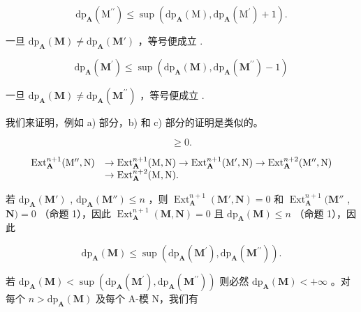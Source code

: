 \[
\mathrm{dp} _ {\mathbf {A}} \left(\mathrm{M} ^ {\prime \prime}\right) \leqslant \sup \left(\mathrm{dp} _ {\mathbf {A}} (\mathrm{M}), \mathrm{dp} _ {\mathbf {A}} \left(\mathrm{M} ^ {\prime}\right) + 1\right).
\]

一旦 \(\mathrm{dp}_{\mathbf{A}}(\mathbf{M}) \neq \mathrm{dp}_{\mathbf{A}}(\mathbf{M}')\) ，等号便成立 .

\[
\mathrm{dp} _ {\mathbf {A}} \left(\mathbf {M} ^ {\prime}\right) \leqslant \sup \left(\mathrm{dp} _ {\mathbf {A}} (\mathbf {M}), \mathrm{dp} _ {\mathbf {A}} \left(\mathbf {M} ^ {\prime \prime}\right) - 1\right)
\]

一旦 \(\mathrm{dp}_{\mathbf{A}}(\mathbf{M}) \neq \mathrm{dp}_{\mathbf{A}}(\mathbf{M}^{\prime \prime})\) ，等号便成立 .

我们来证明，例如 a) 部分，b) 和 c) 部分的证明是类似的。

\[
\geqslant 0.
\]

\[
\begin{array}{r l}\operatorname{Ext} _ {\mathbf {A}} ^ {n + 1} (\mathrm{M} ^ {\prime \prime}, \mathrm{N})&\rightarrow \operatorname{Ext} _ {\mathbf {A}} ^ {n + 1} (\mathrm{M}, \mathrm{N}) \rightarrow \operatorname{Ext} _ {\mathbf {A}} ^ {n + 1} (\mathrm{M} ^ {\prime}, \mathrm{N}) \rightarrow \operatorname{Ext} _ {\mathbf {A}} ^ {n + 2} (\mathrm{M} ^ {\prime \prime}, \mathrm{N})\\&\rightarrow \operatorname{Ext} _ {\mathbf {A}} ^ {n + 2} (\mathrm{M}, \mathrm{N}).\end{array}
\]

若 \(\mathrm{dp}_{\mathbf{A}}(\mathbf{M}')\) , \(\mathrm{dp}_{\mathbf{A}}(\mathbf{M}'')\leqslant n\) ，则 \(\operatorname{Ext}_{\mathbf{A}}^{n+1}(\mathbf{M}',\mathbf{N})=0\) 和 \(\operatorname{Ext}_{\mathbf{A}}^{n+1}(\mathbf{M}''\) , \(\mathbf{N})=0\) （命题 1），因此 \(\operatorname{Ext}_{\mathbf{A}}^{n+1}(\mathbf{M},\mathbf{N})=0\) 且 \(\mathrm{dp}_{\mathbf{A}}(\mathbf{M})\leqslant n\) （命题 1），因此

\[
\mathrm{dp} _ {\mathbf {A}} (\mathbf {M}) \leqslant \sup \left(\mathrm{dp} _ {\mathbf {A}} (\mathbf {M} ^ {\prime}), \mathrm{dp} _ {\mathbf {A}} (\mathbf {M} ^ {\prime \prime})\right).
\]

若 \(\mathrm{dp}_{\mathbf{A}}(\mathbf{M}) < \sup (\mathrm{dp}_{\mathbf{A}}(\mathbf{M}^{\prime}),\mathrm{dp}_{\mathbf{A}}(\mathbf{M}^{\prime \prime}))\) 则必然 \(\mathrm{dp}_{\mathbf{A}}(\mathbf{M}) < + \infty\) 。对每个 \(n > \mathrm{dp}_{\mathbf{A}}(\mathbf{M})\) 及每个 A-模 N，我们有


